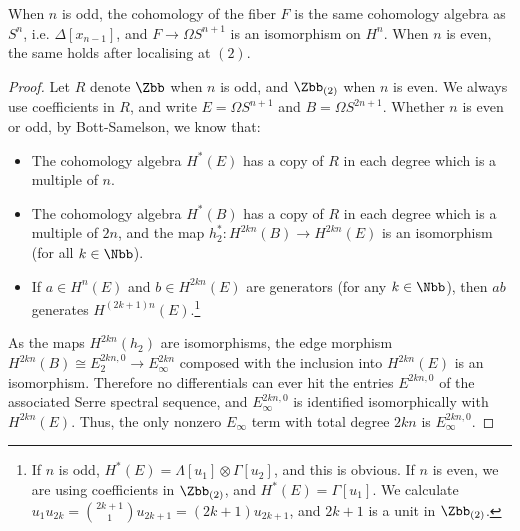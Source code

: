 \begin{claim}\label{SerreSSEHPfiberArg}
	When $n$ is odd, the cohomology of the fiber $F$ is the same cohomology algebra as $S^n$, i.e. $\Delta[x_{n-1}]$, and $F\to \Omega S^{n+1}$ is an isomorphism on $H^n$.
	When $n$ is even, the same holds after localising at $(2)$.
\end{claim}
\begin{proof}
Let $R$ denote $\Zbb$ when $n$ is odd, and $\Zbb_{(2)}$ when $n$ is even. We always use coefficients in $R$, and write $E=\Omega S^{n+1}$ and $B=\Omega S^{2n+1}$. Whether $n$ is even or odd, by Bott-Samelson, we know that:
\begin{itemize}
\item The cohomology algebra $H^*(E)$ has a copy of $R$ in each degree which is a multiple of $n$.
\item The cohomology algebra $H^*(B)$ has a copy of $R$ in each degree which is a multiple of $2n$, and the map $h_2^*:H^{2kn}(B)\to H^{2kn}(E)$ is an isomorphism (for all $k\in\Nbb$).
\item If $a\in H^{n}(E)$ and $b\in H^{2kn}(E)$ are generators (for any $k\in\Nbb$), then $ab$ generates $H^{(2k+1)n}(E)$.\footnote{If $n$ is odd, $H^*(E)=\Lambda[u_1]\otimes \Gamma[u_2]$, and this is obvious. If $n$ is even, we are using coefficients in $\Zbb_{(2)}$, and $H^*(E)=\Gamma[u_1]$. We calculate $u_1u_{2k}=\binom{2k+1}{1}u_{2k+1}=(2k+1)u_{2k+1}$, and $2k+1$ is a unit in $\Zbb_{(2)}$.}
\end{itemize}

As the maps $H^{2kn}(h_2)$ are isomorphisms, the edge morphism $H^{2kn}(B)\cong E^{2kn,0}_2\to E^{2kn}_{\infty}   $ composed with the inclusion into $H^{2kn}(E)  $ is an isomorphism.
Therefore no differentials can ever hit the entries $E^{2kn,0}$ of the associated Serre spectral sequence, and $E^{2kn,0}_\infty$ is identified isomorphically with $H^{2kn}(E)$.
Thus, the only nonzero $E_\infty$ term with total degree $2kn$ is $E_\infty^{2kn,0}$.


\end{proof}
